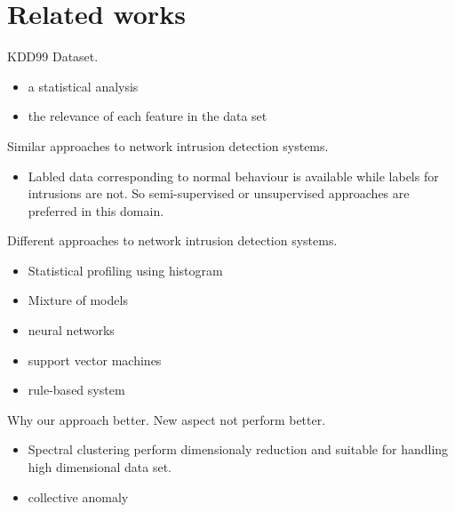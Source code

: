 \section{Related works}

KDD99 Dataset.

\begin{itemize}
\item a statistical analysis \cite{tavallaee09}
\item the relevance of each feature in the data set \cite{olusola10} \cite{kayacik05}
\end{itemize}

Similar approaches to network intrusion detection systems.

\begin{itemize}
\item Labled data corresponding to normal behaviour is available while labels for intrusions are not. So semi-supervised or unsupervised approaches are preferred in this domain. \cite{chandola09}
\end{itemize}

Different approaches to network intrusion detection systems.

\begin{itemize}
\item Statistical profiling using histogram
\item Mixture of models
\item neural networks
\item support vector machines
\item rule-based system
\end{itemize}

Why our approach better. New aspect not perform better.
\begin{itemize}
\item Spectral clustering perform dimensionaly reduction and suitable for handling high dimensional data set.
\item collective anomaly
\end{itemize}

